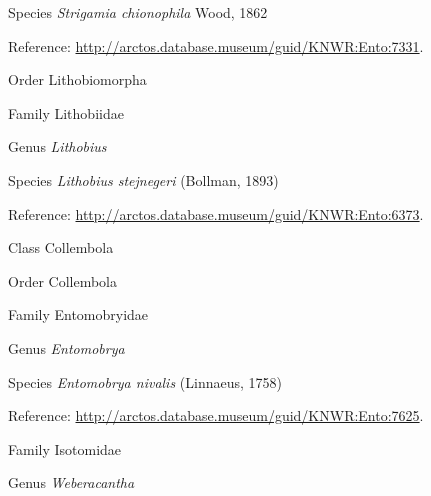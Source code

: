 \documentclass[9pt, article]{memoir}
\begin{document}
\begin{multicols}{2}
\vspace{6pt}\noindent\hspace{36pt}Species \textit{Strigamia chionophila} Wood, 1862


\vspace{6pt}Reference: 
\url{http://arctos.database.museum/guid/KNWR:Ento:7331}.

\vspace{6pt}\noindent\hspace{18pt}Order Lithobiomorpha


\vspace{6pt}\noindent\hspace{24pt}Family Lithobiidae


\vspace{6pt}\noindent\hspace{30pt}Genus \textit{Lithobius}


\vspace{6pt}\noindent\hspace{36pt}Species \textit{Lithobius stejnegeri} (Bollman, 1893)


\vspace{6pt}Reference: 
\url{http://arctos.database.museum/guid/KNWR:Ento:6373}.

\vspace{6pt}\noindent\hspace{12pt}Class Collembola


\vspace{6pt}\noindent\hspace{18pt}Order Collembola


\vspace{6pt}\noindent\hspace{24pt}Family Entomobryidae


\vspace{6pt}\noindent\hspace{30pt}Genus \textit{Entomobrya}


\vspace{6pt}\noindent\hspace{36pt}Species \textit{Entomobrya nivalis} (Linnaeus, 1758)


\vspace{6pt}Reference: 
\url{http://arctos.database.museum/guid/KNWR:Ento:7625}.

\vspace{6pt}\noindent\hspace{24pt}Family Isotomidae


\vspace{6pt}\noindent\hspace{30pt}Genus \textit{Weberacantha}



\end{multicols}
\end{document}
